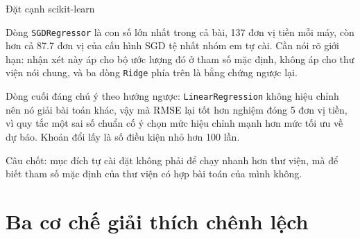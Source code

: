 \documentclass[10pt, aspectratio=169]{beamer}
\begin{document}
\begin{frame}{Đặt cạnh scikit-learn}
{  Dòng \texttt{SGDRegressor} là con số lớn nhất trong cả bài, \num{137} đơn vị
  tiền mỗi máy, còn hơn cả \num{87.7} đơn vị của cấu hình SGD tệ nhất nhóm em tự
  cài. Cần nói rõ giới hạn: nhận xét này áp cho bộ ước lượng đó ở tham số mặc
  định, không áp cho thư viện nói chung, và ba dòng \texttt{Ridge} phía trên là
  bằng chứng ngược lại.

  Dòng cuối đáng chú ý theo hướng ngược: \texttt{LinearRegression} không hiệu
  chỉnh nên nó giải bài toán khác, vậy mà RMSE lại tốt hơn nghiệm đóng 5 đơn vị
  tiền, vì quy tắc một sai số chuẩn cố ý chọn mức hiệu chỉnh mạnh hơn mức tối ưu
  về dự báo. Khoản đổi lấy là số điều kiện nhỏ hơn 100 lần.

  Câu chốt: mục đích tự cài đặt không phải để chạy nhanh hơn thư viện, mà để
  biết tham số mặc định của thư viện có hợp bài toán của mình không.}
\end{frame}

\section{Ba cơ chế giải thích chênh lệch}
\end{document}

